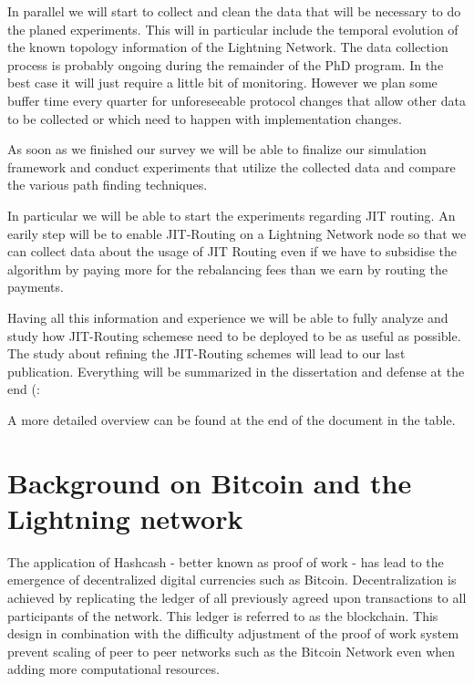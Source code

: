 \documentclass[a4paper]{paper}
\begin{document}
In parallel we will start to collect and clean the data that will be necessary to do the planed experiments.
This will in particular include the temporal evolution of the known topology information of the Lightning Network.
The data collection process is probably ongoing during the remainder of the PhD program.
In the best case it will just require a little bit of monitoring.
However we plan some buffer time every quarter for unforeseeable protocol changes that allow other data to be collected or which need to happen with implementation changes.

As soon as we finished our survey we will be able to finalize our simulation framework and conduct experiments that utilize the collected data and compare the various path finding techniques.

In particular we will be able to start the experiments regarding JIT routing.
An earily step will be to enable JIT-Routing on a Lightning Network node so that we can collect data about the usage of JIT Routing even if we have to subsidise the algorithm by paying more for the rebalancing fees than we earn by routing the payments.

Having all this information and experience we will be able to fully analyze and study how JIT-Routing schemese need to be deployed to be as useful as possible.
The study about refining the JIT-Routing schemes will lead to our last publication.
Everything will be summarized in the dissertation and defense at the end (: 

A more detailed overview can be found at the end of the document in the table. 




\appendix
\section{Background on Bitcoin and the Lightning network}
The application of Hashcash \cite{back2002hashcash} - better known as proof of work -  has lead to the emergence of decentralized digital currencies such as Bitcoin\cite{nakamoto2008bitcoin}.
Decentralization is achieved by replicating the ledger of all previously agreed upon transactions to all participants of the network.
This ledger is referred to as the blockchain.
This design in combination with the difficulty adjustment of the proof of work system prevent scaling of peer to peer networks such as the Bitcoin Network even when adding more computational resources.
\end{document}
